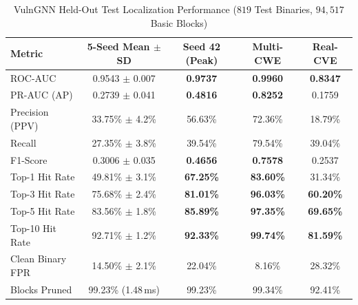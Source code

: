 \documentclass[10pt,conference]{IEEEtran}
\begin{document}
\begin{table}[!t]
\caption{VulnGNN Held-Out Test Localization Performance ($819$ Test Binaries, $94{,}517$ Basic Blocks)}
\label{tab:gnn}
\renewcommand{\arraystretch}{1.0}
\footnotesize
\setlength\tabcolsep{2.2pt}
\begin{tabular}{lcccc}
\toprule
\textbf{Metric} & \textbf{5-Seed Mean $\pm$ SD} & \textbf{Seed 42 (Peak)} & \textbf{Multi-CWE} & \textbf{Real-CVE} \\
\midrule
ROC-AUC                 & 0.9543 $\pm$ 0.007 & \textbf{0.9737} & \textbf{0.9960} & \textbf{0.8347} \\
PR-AUC (AP)             & 0.2739 $\pm$ 0.041 & \textbf{0.4816} & \textbf{0.8252} & 0.1759 \\
Precision (PPV)         & 33.75\% $\pm$ 4.2\%& 56.63\%         & 72.36\%         & 18.79\% \\
Recall                  & 27.35\% $\pm$ 3.8\%& 39.54\%         & 79.54\%         & 39.04\% \\
F1-Score                & 0.3006 $\pm$ 0.035 & \textbf{0.4656} & \textbf{0.7578} & 0.2537 \\
Top-1 Hit Rate          & 49.81\% $\pm$ 3.1\%& \textbf{67.25\%}& \textbf{83.60\%}& 31.34\% \\
Top-3 Hit Rate          & 75.68\% $\pm$ 2.4\%& \textbf{81.01\%}& \textbf{96.03\%}& \textbf{60.20\%} \\
Top-5 Hit Rate          & 83.56\% $\pm$ 1.8\%& \textbf{85.89\%}& \textbf{97.35\%}& \textbf{69.65\%} \\
Top-10 Hit Rate         & 92.71\% $\pm$ 1.2\%& \textbf{92.33\%}& \textbf{99.74\%}& \textbf{81.59\%} \\
Clean Binary FPR        & 14.50\% $\pm$ 2.1\%& 22.04\%         & 8.16\%          & 28.32\% \\
Blocks Pruned           & 99.23\% (1.48\,ms) & 99.23\%         & 99.34\%         & 92.41\% \\
\bottomrule
\end{tabular}
\end{table}
\end{document}
